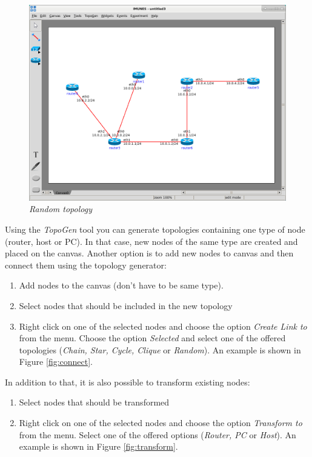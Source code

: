 \begin{figure}[H]
\centering
\vspace{10pt}
\includegraphics[width=\textwidth]{./images/random.png}
\caption{\emph{Random topology}}
\label{fig:random}
\end{figure} 
 
Using the \emph{TopoGen} tool you can generate topologies containing one type
of node (router, host or PC). In that case, new nodes of the same type are
created and placed on the canvas. Another option is to add new nodes to canvas
and then connect them using the topology generator:
\begin{enumerate}
  \item Add nodes to the canvas (don't have to be same type). 
  \item Select nodes that should be included in the new topology
  \item Right click on one of the selected nodes and choose the option
\emph{Create Link to} from the menu. Choose the option \emph{Selected} and
select one of the offered topologies (\emph{Chain, Star, Cycle, Clique} or
\emph{Random}). An example is shown in Figure \ref{fig:connect}. 
\end{enumerate}

In addition to that, it is also possible to transform existing nodes:
\begin{enumerate}
  \item Select nodes that should be transformed
  \item Right click on one of the selected nodes and choose the option
\emph{Transform to} from the menu. Select one of the offered options
(\emph{Router, PC} or \emph{Host}). An example is shown in Figure
\ref{fig:transform}.
\end{enumerate}

